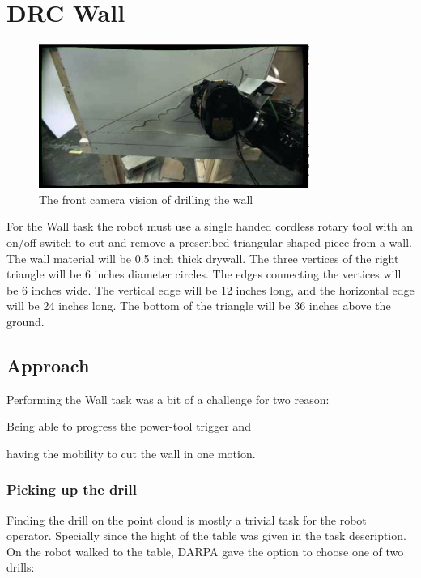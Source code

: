 \documentclass[12pt]{report}
\begin{document}
\section{DRC Wall}
\begin{figure}
  \begin{center}
    \includegraphics[scale=0.5]{images/drilling2.png}
  \end{center}
  \caption{The front camera vision of drilling the wall}
\end{figure}
For the Wall task the robot must use a single handed cordless rotary tool with an on/off switch to cut and remove a prescribed triangular shaped piece from a wall. The wall material will be 0.5 inch thick drywall. The three vertices of the right triangle will be 6 inches diameter circles. The edges connecting the vertices will be 6 inches wide. The vertical edge will be 12 inches long, and the horizontal edge will be 24 inches long. The bottom of the triangle will be 36 inches above the ground. \cite{walltask}

\subsection{Approach}
Performing the Wall task was a bit of a challenge for two reason: \begin{inparaenum}
\item Being able to progress the power-tool trigger and 
\item having the mobility to cut the wall in one motion. \end{inparaenum} 

\subsubsection{Picking up the drill}
Finding the drill on the point cloud is mostly a trivial task for the robot operator. Specially since the hight of the table was given in the task description. On the robot walked to the table, DARPA gave the option to choose one of two drills:
\end{document}
